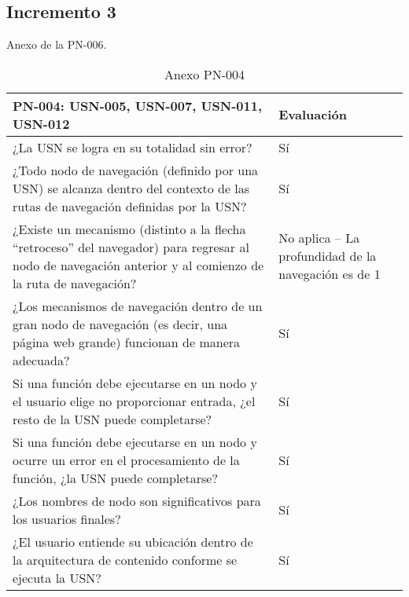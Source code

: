 \subsection{Incremento 3}

Anexo de la PN-006.

\begin{table}[htpb]
\centering
\begin{tabularx}{\textwidth}{|X|X|}
\hline
\rowcolor[gray]{0.9}\textbf{PN-004: USN-005, USN-007, USN-011, USN-012}                                                                                                         & \textbf{Evaluación}                                 \\ \hline
¿La USN se logra en su totalidad sin error?                                                                                                                & Sí                                                  \\ \hline
¿Todo nodo de navegación (definido por una USN) se alcanza dentro del contexto de las rutas de navegación definidas por la USN?                            & Sí                                                  \\ \hline
¿Existe un mecanismo (distinto a la flecha ``retroceso'' del navegador) para regresar al nodo de navegación anterior y al comienzo de la ruta de navegación? & No aplica -- La profundidad de la navegación es de 1 \\ \hline
¿Los mecanismos de navegación dentro de un gran nodo de navegación (es decir, una página web grande) funcionan de manera adecuada?                         & Sí                                                  \\ \hline
Si una función debe ejecutarse en un nodo y el usuario elige no proporcionar entrada, ¿el resto de la USN puede completarse?                               & Sí                                                  \\ \hline
Si una función debe ejecutarse en un nodo y ocurre un error en el procesamiento de la función, ¿la USN puede completarse?                                  & Sí                                                  \\ \hline
¿Los nombres de nodo son significativos para los usuarios finales?                                                                                         & Sí                                                  \\ \hline
¿El usuario entiende su ubicación dentro de la arquitectura de contenido conforme se ejecuta la USN?                                                       & Sí                                                  \\ \hline
\end{tabularx}
\caption{Anexo PN-004}
\end{table}